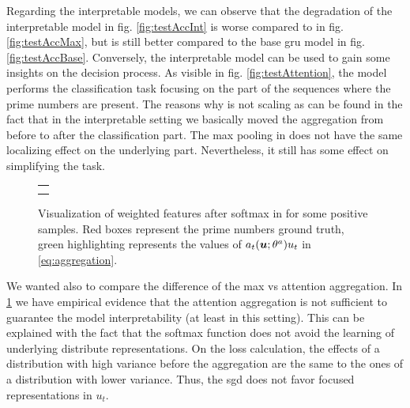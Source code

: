 Regarding the interpretable models, we can observe that
the degradation of the interpretable \maxi{} model in
fig. \ref{fig:testAccInt} is worse 
compared to \maxp{} in fig. \ref{fig:testAccMax},
but is still better compared to the base \ac{gru} model in
fig. \ref{fig:testAccBase}. Conversely, the interpretable model can be
used to gain
some insights on the decision process. As visible in
fig. \ref{fig:testAttention}, the model performs the classification
task focusing on 
the part of the sequences where the prime numbers are present. The
reasons why \maxi{} is not scaling as \maxp{} can be found in the fact
that in the interpretable setting we basically moved the aggregation
from before to after the classification part. The max pooling in
\maxi{} does not have the same localizing effect on the underlying
part. Nevertheless, it still has some effect on simplifying the
task.

\begin{figure}
  \centering
  \footnotesize
  \begin{tabular}{|p{\floatwidth}|}
    \hline
    \\
    \hline
    \\
    \hline
    \\
    \hline
  \end{tabular}
  \caption{Visualization of weighted features after softmax in
    \softmaxi{} for some
    positive samples. Red boxes represent the prime numbers ground
    truth, green highlighting represents the values of
    $a_t(\bm{u};\theta^a)u_t$ in
    \eqref{eq:aggregation}.}
  \label{fig:testAttentionSoft}
\end{figure}
We wanted also to compare the difference of the max vs attention
aggregation. In 
\cref{fig:testAttentionSoft} we have empirical evidence that the
attention aggregation is not sufficient to guarantee the model
interpretability (at least in this setting). This can be explained
with the fact that the softmax function does 
not avoid the learning of underlying
distribute representations. 
On the loss calculation, the effects of a
distribution with high variance before the aggregation are the 
same to the ones of a distribution with lower variance. Thus, the \ac{sgd} does
not favor focused representations in $u_t$.

